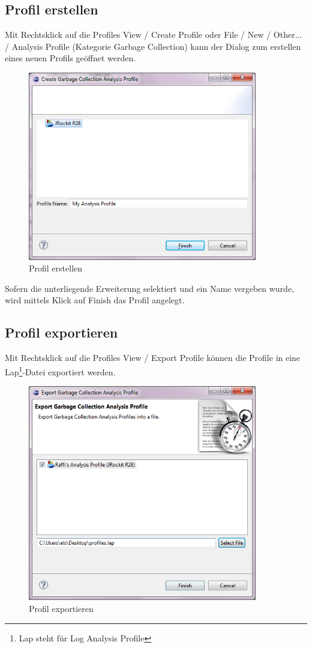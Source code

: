 \subsection{Profil erstellen}
Mit Rechtsklick auf die Profiles View / Create Profile oder File / New / Other... / Analysis Profile (Kategorie Garbage Collection) kann der Dialog zum erstellen eines neuen Profils geöffnet werden. 
 \begin{figure}[H]
  	\centering
    	\includegraphics[width=10cm]{images/tutorial_newprofile}
        	\caption{Profil erstellen}
\end{figure}
Sofern die unterliegende Erweiterung selektiert und ein Name vergeben wurde, wird mittels Klick auf Finish das Profil angelegt.

\subsection{Profil exportieren}
Mit Rechtsklick auf die Profiles View / Export Profile können die Profile in eine Lap\footnote{Lap steht für Log Analysis Profile}-Datei exportiert werden.
 \begin{figure}[H]
  	\centering
    	\includegraphics[width=10cm]{images/tutorial_exportprofile}
        	\caption{Profil exportieren}
\end{figure}

